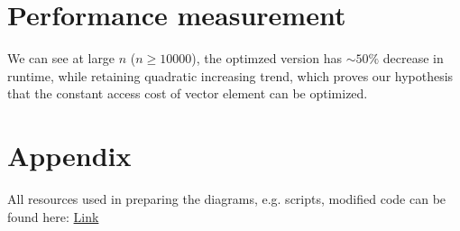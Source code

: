 \documentclass[a4paper]{article}
\begin{document}
\section{Performance measurement}
\par\vspace{-1.5em}
\par\vspace{3ex}
\begin{minipage}{0.5\linewidth}
    \noindent{}
    \end{minipage}\hfill
    \begin{minipage}{0.5\linewidth}
        We can see at large $n$ ($n \geq 10000$), the optimzed version has $\sim 50\%$ decrease in runtime, while retaining quadratic increasing trend,
        which proves our hypothesis that the constant access cost of vector element can be optimized.
    \end{minipage}\hfill
    \par\vspace{3ex}

\section{Appendix}
All resources used in preparing the diagrams, e.g. scripts, modified code can be found here: 
\href{https://github.com/Wxy2003-xy/CS3210-Lab-References}{Link}
\end{document}
